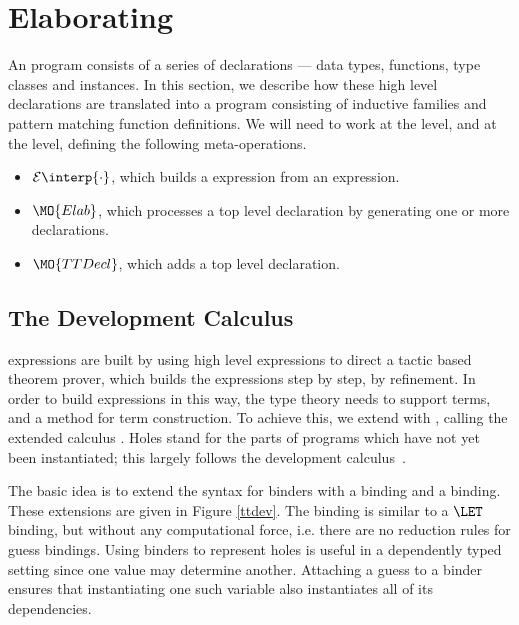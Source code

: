 \newcommand{\ttinterp}[1]{\mathcal{E}\interp{#1}}
\newcommand{\ttpinterp}[1]{\mathcal{P}\interp{#1}}
\newcommand{\uninterp}[1]{\mathcal{T}\interp{#1}}

\section{Elaborating \Idris{}}

\label{sect:elaboration}

An \Idris{} program consists of a series of declarations --- data types,
functions, type classes and instances. In this section, we describe how these
high level declarations are translated into a \TT{} program consisting of
inductive families and pattern matching function definitions. We will need to
work at the  level, and at the  level,
defining the following meta-operations.

\begin{itemize}
\item $\ttinterp{\cdot}$, which builds a \TT{} expression from an \Idris{} expression.
\item $\MO{Elab}$, which processes a top level \Idris{} declaration by generating
one or more \TT{} declarations.
\item $\MO{TTDecl}$, which adds a top level \TT{} declaration.
\end{itemize}


\subsection{The Development Calculus \TTdev}

\TT{} expressions are built by using high level \Idris{} expressions to
direct a tactic based theorem prover, which builds the \TT{} expressions
step by step, by refinement. In order to build expressions in this way,
the type theory needs to support
 terms, and a method for term construction. 
To achieve this, we extend \TT{} with ,
calling the extended calculus \TTdev{}.
Holes stand for the parts of programs which have not yet been
instantiated; this largely follows the \Oleg{} development
calculus~\cite{McBride1999}.

The basic idea is to extend the syntax for binders with a 
binding and a  binding. 
These extensions are given in Figure \ref{ttdev}.
The  binding is
similar to a $\LET$ binding, but without any computational force,
i.e. there are no reduction rules for guess bindings. 
Using binders to represent holes is useful in a dependently typed setting since
one value may determine another. Attaching a guess to a binder ensures that
instantiating one such variable also instantiates all of its dependencies. 

